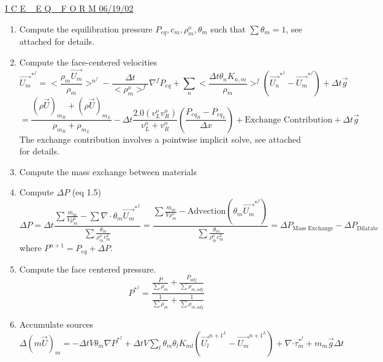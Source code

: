 \documentclass[fleqn]{article}
\begin{document}
\setlength{\abovedisplayskip}{0.1in}
\setlength{\mathindent}{0.0in}
\underline{ I C E  ~ E Q ~  F O R M  \hspace{ 0.5in}06/19/02}

\begin{enumerate}
\item Compute the equilibration pressure 
$P_{eq}, c_m, \rho^o_m, \theta_m$ such that $\sum\theta_m = 1$, see attached for details.
\item Compute the face-centered velocities 
\[
    \vec{U_m}^{*^{f}} 
    = \biggl<\frac{\rho_m \vec{U_m}}{\rho_m}\biggr>^{n^{f}}
    -\frac{\Delta{t}}{<\rho^o_m>^f} \nabla^{f}P_{eq}
    + \sum_n\biggl<\frac{\Delta{t}\theta_n K_{n,m}}{\rho_m}\biggr>^f(\vec{U_n}^{*^{f}} - \vec{U_m}^{*^{f}})
    + \Delta{t}\vec{g}
\]
\[    
   =\frac{(\rho \vec{U})_{m_R} + (\rho \vec{U})_{m_L}}{\rho_{m_R} + \rho_{m_L}}
    -\Delta{t}\frac{2.0 (v^o_L v^o_R)}{v^o_L + v^o_R} (\frac{P_{eq_R} - P_{eq_L}}{\Delta x})
    + \text{Exchange Contribution}
    + \Delta{t}\vec{g}
\]
The exchange contribution involves a pointwise implicit solve, see attached for details.
\item Compute the mass exchange between materials

\item Compute $\Delta P$ (eq 1.5)  
\[
     \Delta P = \Delta t \frac{ \sum {\frac{\dot{m_m}}{V\rho^0_m}} -\sum\nabla \cdot \theta_m \vec{U_m}^{*^{f}}}
     {\sum \frac{\theta_m}{\rho^o_m c^2_m}} 
     =
     \frac{\sum {\frac{\dot{m_m}}{V\rho^0_m}} -\text{Advection} (\theta_m\vec{U_m}^{*^{f}})}
     {\sum \frac{\theta_m}{\rho^o_m c^2_m}} 
    = \Delta{P_{\text{Mass Exchange}}} - \Delta{P_{\text{Dilatate}}}
\]
where $P^{n+1} = P_{eq} + \Delta{P}$.
\item Compute the face centered pressure.
\[
    P^{*^{f}} = \frac{\frac{P}{\sum\rho_m} + \frac{P_{adj}}{\sum\rho_{m, adj}}}
                     {\frac{1}{\sum\rho_m} + \frac{1}{\sum\rho_{m, adj}}}
\]
\item Accumulate sources\\  
 $\Delta(m\vec{U})_m = -\Delta{t} V \theta_m\nabla{ P^{*^f}} 
    + \Delta{t}V\sum_l\theta_m\theta_l K_{ml}(\vec{U_l}^{{n+1}^L} - \vec{U_m}^{{n+1}^L} )
    + \nabla{ \cdot \tau^{*^f}_m}
    + m_m \vec{g}\Delta{t}$
    

\end{enumerate}
\end{document}
